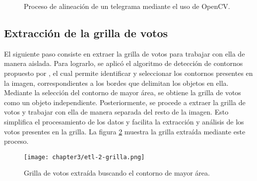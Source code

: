 \begin{figure}[H]
    \centering



    \caption[Alineación de un telegrama]{Proceso de alineación de un telegrama mediante el uso de OpenCV.}
    \label{fig:etl-1-rotacion}
\end{figure}

\subsection{Extracción de la grilla de votos}

El siguiente paso consiste en extraer la grilla de votos para trabajar con ella de manera aislada. Para lograrlo, se
aplicó el algoritmo de detección de contornos propuesto por \cite{suzuki1985topological}, el cual permite identificar y
seleccionar los contornos presentes en la imagen, correspondientes a los bordes que delimitan los objetos en ella.
Mediante la selección del contorno de mayor área, se obtiene la grilla de votos como un objeto independiente.
Posteriormente, se procede a extraer la grilla de votos y trabajar con ella de manera separada del resto de la imagen.
Esto simplifica el procesamiento de los datos y facilita la extracción y análisis de los votos presentes en la grilla.
La figura \ref{fig:etl-2-grilla} muestra la grilla extraída mediante este proceso.

\begin{figure}[H]
    \centering
    \texttt{[image: chapter3/etl-2-grilla.png]}
    \caption[Grilla de votos detectada]{Grilla de votos extraída buscando el contorno de mayor área.}
    \label{fig:etl-2-grilla}
\end{figure}

